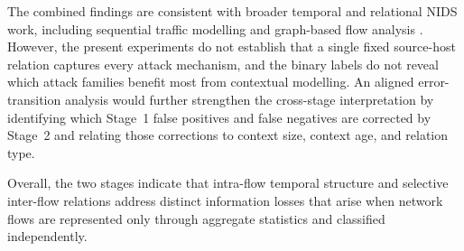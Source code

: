 \documentclass[11pt,fleqn]{report}
\begin{document}
The combined findings are consistent with broader temporal and relational NIDS work, including sequential traffic modelling and graph-based flow analysis \cite{LiuPatras2022NetSentry,Deng2023FlowTopology,Xu2024SSLGNN}. However, the present experiments do not establish that a single fixed source-host relation captures every attack mechanism, and the binary labels do not reveal which attack families benefit most from contextual modelling. An aligned error-transition analysis would further strengthen the cross-stage interpretation by identifying which Stage~1 false positives and false negatives are corrected by Stage~2 and relating those corrections to context size, context age, and relation type.

Overall, the two stages indicate that intra-flow temporal structure and selective inter-flow relations address distinct information losses that arise when network flows are represented only through aggregate statistics and classified independently.


\end{document}
